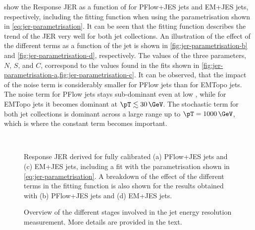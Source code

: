  show the Response JER as a function of \pTtruth for PFlow+JES jets and EM+JES jets, respectively, including the fitting function when using the parametrisation shown in \cref{eq:jer-parametrisation}. It can be seen that the fitting function describes the trend of the JER very well for both jet collections.
An illustration of the effect of the different terms as a function of the jet \pT is shown in \cref{fig:jer-parametrisation-b} and \cref{fig:jer-parametrisation-d}, respectively. The values of the three parameters, $N$, $S$, and $C$, correspond to the values found in the fits shown in \cref{fig:jer-parametrisation-a,fig:jer-parametrisation-c}.
It can be observed, that the impact of the noise term is considerably smaller for PFlow jets than for EMTopo jets.
The noise term for PFlow jets stays sub-dominant even at low \pT, while for EMTopo jets it becomes dominant at $\pT \lesssim 30\,\GeV$. The stochastic term for both jet collections is dominant across a large \pT range up to $\pT = 1000\,\GeV$, which is where the constant term becomes important.



\begin{figure}[t]
     \\
    \caption{Response JER derived for fully calibrated (a) PFlow+JES jets and (c) EM+JES jets, including a fit with the parametrisation shown in \cref{eq:jer-parametrisation}. A breakdown of the effect of the different terms in the fitting function is also shown for the results obtained with (b) PFlow+JES jets and (d) EM+JES jets.}
    \label{fig:jer-parametrisation}
\end{figure}

\FloatBarrier
\begin{figure}[t]
    \caption{Overview of the different stages involved in the jet energy resolution measurement. More details are provided in the text.}
    \label{fig:flow-chart-jer}
\end{figure}


